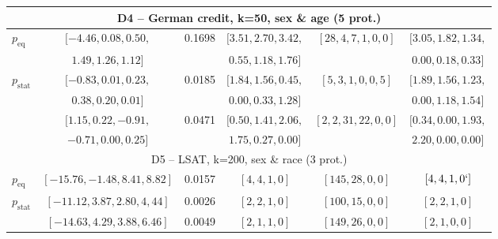\begin{table}[b!]
{\begin{tabular}{lccccc}
			\midrule
			\multicolumn{6}{c}{D4 -- German credit, k=50, sex \& age (5 prot.)} \\
			\midrule
			\algoFAIR $p_{\text{eq}}$ &  $[-4.46, 0.08, 0.50, $ & 0.1698 & $[3.51, 2.70, 3.42, $ & $[28, 4, 7, 1, 0, 0]$ & $[3.05, 1.82, 1.34, $\\
			& $1.49, 1.26, 1.12]$ & &  $ 0.55, 1.18, 1.76]$& & $0.00, 0.18, 0.33]$  \\
			\algoFAIR $p_{\text{stat}}$ &  $[-0.83, 0.01, 0.23, $& 0.0185 & $[1.84, 1.56, 0.45, $ & $[5, 3, 1, 0, 0, 5]$ & $[1.89, 1.56, 1.23,$  \\
			& $0.38, 0.20, 0.01]$  & & $0.00, 0.33, 1.28]$ & & $ 0.00, 1.18, 1.54]$\\
			\citeauthor{zehlike2020matching} &  $[1.15, 0.22, -0.91, $ & 0.0471 & $[0.50, 1.41, 2.06,$ & $[2, 2, 31, 22, 0, 0]$ & $[0.34, 0.00, 1.93, $ \\
			& $-0.71, 0.00, 0.25]$ &  & $ 1.75, 0.27, 0.00]$ & & $2.20, 0.00, 0.00]$\\

			\midrule
			\multicolumn{6}{c}{D5 -- LSAT, k=200, sex \& race (3 prot.)} \\
			\midrule
			\algoFAIR $p_{\text{eq}}$ & $[-15.76, -1.48, 8.41, 8.82]$ & 0.0157 & $[4,4,1,0]$ & $[145, 28, 0, 0]$ & $[4, 4, 1, 0`]$  \\
			\algoFAIR $p_{\text{stat}}$ & $[-11.12, 3.87, 2.80, 4,44]$ & 0.0026 & $[2, 2, 1, 0]$ & $[100, 15, 0, 0]$ & $[2, 2, 1, 0]$  \\
			\citeauthor{zehlike2020matching} &  $[-14.63, 4.29, 3.88, 6.46]$ & 0.0049 & $[2, 1, 1, 0]$ & $[149, 26, 0, 0]$ & $[2, 1, 0, 0]$  \\


\end{tabular}}
\end{table}
